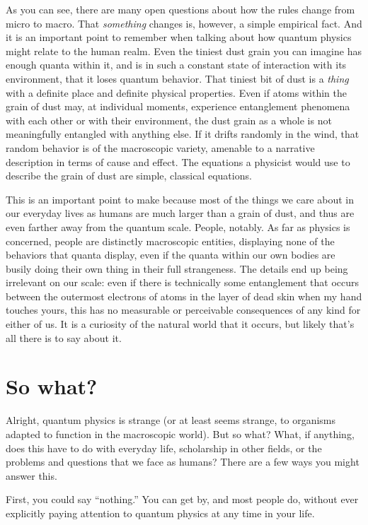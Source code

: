 \documentclass[onecolumn,preprintnumbers,amsmath,amssymbn,reprint,nofootinbib,superscriptaddress]{revtex4}    %
\begin{document}
As you can see, there are many open questions about how the rules change from micro to macro.  That {\em something } changes is, however, a simple empirical fact. And it is an important point to remember when talking about how quantum physics might relate to the human realm.  Even the tiniest dust grain you can imagine has enough quanta within it, and is in such a constant state of interaction with its environment, that it loses quantum behavior.  That tiniest bit of dust is a {\em thing} with a definite place and definite physical properties.  Even if atoms within the grain of dust may, at individual moments, experience entanglement phenomena with each other or with their environment, the dust grain as a whole is not meaningfully entangled with anything else. If it drifts randomly in the wind, that random behavior is of the macroscopic variety, amenable to a narrative description in terms of cause and effect.  The equations a physicist would use to describe the grain of dust are simple, classical equations.

This is an important point to make because most of the things we care about in our everyday lives as humans are much larger than a grain of dust, and thus are even farther away from the quantum scale.  People, notably.  As far as physics is concerned, people are distinctly macroscopic entities, displaying none of the behaviors that quanta display, even if the quanta within our own bodies are busily doing their own thing in their full strangeness.  The details end up being irrelevant on our scale:  even if there is technically some entanglement that occurs between the outermost electrons of atoms in the layer of dead skin when my hand touches yours, this has no measurable or perceivable consequences of any kind for either of us.  It is a curiosity of the natural world that it occurs, but likely that's all there is to say about it.   

\section{So what?}

Alright, quantum physics is strange (or at least seems strange, to organisms adapted to function in the macroscopic world).  But so what?  What, if anything, does this have to do with everyday life, scholarship in other fields, or the problems and questions that we face as humans? There are a few ways you might answer this. 

First, you could say ``nothing.''  You can get by, and most people do, without ever explicitly paying attention to quantum physics at any time in your life.  
\end{document}
